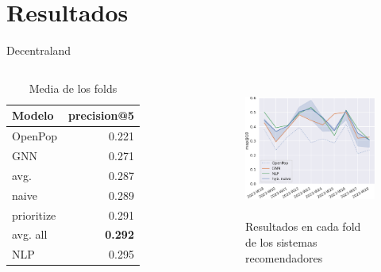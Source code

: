 \section{Resultados}

\begin{frame}{Decentraland}
    \begin{columns}
        \begin{table}
            \begin{tabular}{l|r}
\textbf{Modelo} & \textbf{precision@5} \\
\hline
OpenPop & 0.221 \\
GNN        & 0.271 \\
\hline
avg.     & 0.287 \\
naive      & 0.289 \\
prioritize & 0.291 \\
avg. all & \textbf{0.292} \\
\hline
NLP & 0.295 \\
            \end{tabular}
            \caption{Media de los folds}
        \end{table}
        \pause
        \begin{figure}
            \centering
            \includegraphics[height=45mm]{./images/graphs/12_hybrid_merge_results_folds_Decentraland_W-THU_normalize=True_compare.pdf}
            \caption{Resultados en cada fold de los sistemas recomendadores}
        \end{figure}
    \end{columns}
\end{frame}


